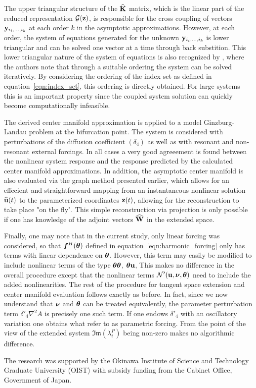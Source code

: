 The upper triangular structure of the $\mathbf{\widehat{K}}$ matrix, which is the linear part of the reduced representation $\mathcal{G}(\mathbf{z})$, is responsible for the cross coupling of vectors $\mathbf{y}_{i_{i},\ldots,i_{k}}$ at each order $k$ in the asymptotic approximations. However, at each order, the system of equations generated for the unknown $\mathbf{y}_{i_{i},\ldots,i_{k}}$ is lower triangular and can be solved one vector at a time through back substition. This lower triangular nature of the system of equations is also recognized by \citet{vizzaccaro24}, where the authors note that through a suitable ordering the system can be solved iteratively. By considering the ordering of the index set as defined in equation~\eqref{eqn:index_set}, this ordering is directly obtained. For large systems this is an important property since the coupled system solution can quickly become computationally infeasible.

 The derived center manifold approximation is applied to a model Ginzburg-Landau problem at the bifurcation point. The system is considered with perturbations of the diffusion coefficient $(\delta_{4})$ as well as with resonant and non-resonant external forcings. In all cases a very good agreeement is found between the nonlinear system response and the response predicted by the calculated center manifold approximations. In addition, the asymptotic center manifold is also evaluated via the graph method presented earlier, which allows for an effecient and straightforward mapping from an instantaneous nonlinear solution $\widehat{\mathbf{u}}(t)$ to the parameterized coordinates $\mathbf{z}(t)$, allowing for the reconstruction to take place "on the fly". This simple reconstruction via projection is only possible if one has knowledge of the adjoint vectors $\widehat{\mathbf{W}}$ in the extended space. 
 
 Finally, one may note that in the current study, only linear forcing was considered, so that $\boldsymbol{f}^{H}(\boldsymbol{\theta})$ defined in equation~\eqref{eqn:harmonic_forcing} only has terms with linear dependence on $\boldsymbol{\theta}$. However, this term may easily be modified to include nonlinear terms of the type $\boldsymbol{\theta}\boldsymbol{\theta}$, $\boldsymbol{\theta}\mathbf{u}$, \etc This makes no difference in the overall procedure except that the nonlinear terms $\mathcal{N}'(\mathbf{u},\boldsymbol{\nu},\boldsymbol{\theta})$ need to include the added nonlinearities. The rest of the procedure for tangent space extension and center manifold evaluation follows exactly as before. In fact, since we now understand that $\boldsymbol{\nu}$ and $\boldsymbol{\theta}$ can be treated equivalently, the parameter perturbation term $\delta'_{4}\nabla^{2}A$ is precisely one such term. If one endows $\delta'_{4}$ with an oscillatory variation one obtains what \citet{thurnher24} refer to as parametric forcing. From the point of the view of the extended system $\mathfrak{Im}(\lambda^{P}_{i})$ being non-zero makes no algorithmic difference. 

\backmatter

The research was supported by the Okinawa Institute of Science and Technology Graduate	University (OIST) with subsidy funding from the Cabinet Office, Government of Japan. 












